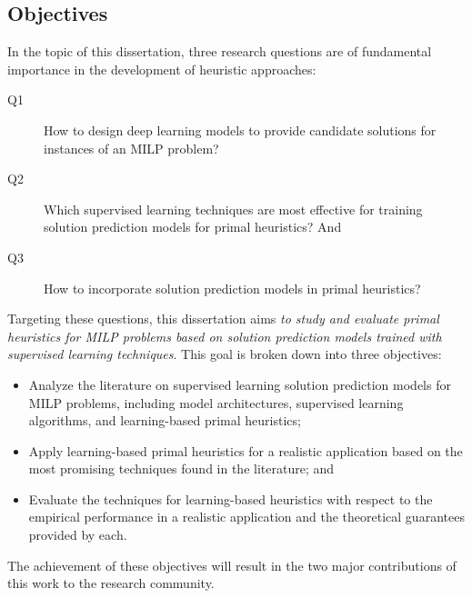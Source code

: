 \subsection*{Objectives}\label{chap:objectives}

In the topic of this dissertation, three research questions are of fundamental importance in the development of heuristic approaches:
\begin{description}
    \item[Q1] How to design deep learning models to provide candidate solutions for instances of an MILP problem?
    \item[Q2] Which supervised learning techniques are most effective for training solution prediction models for primal heuristics? And
    \item[Q3] How to incorporate solution prediction models in primal heuristics?
\end{description}
Targeting these questions, this dissertation aims \emph{to study and evaluate primal heuristics for MILP problems based on solution prediction models trained with supervised learning techniques}.
This goal is broken down into three objectives:
\begin{itemize}
    \item Analyze the literature on supervised learning solution prediction models for MILP problems, including model architectures, supervised learning algorithms, and learning-based primal heuristics;
    \item Apply learning-based primal heuristics for a realistic application based on the most promising techniques found in the literature; and
    \item Evaluate the techniques for learning-based heuristics with respect to the empirical performance in a realistic application and the theoretical guarantees provided by each.
\end{itemize}
The achievement of these objectives will result in the two major contributions of this work to the research community.

